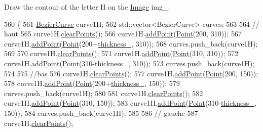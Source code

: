 Draw the contour of the letter H on the \mbox{\hyperlink{class_image}{Image}} img\+\_\+. 


\begin{DoxyCode}
560               \{
561     \mbox{\hyperlink{class_bezier_curve}{BezierCurve}} curve1H;
562     std::vector<BezierCurve> curves;
563 
564     \textcolor{comment}{// haut}
565     curve1H.\mbox{\hyperlink{class_bezier_curve_a0ba8ce66d5af5971ae6a1b506029728e}{clearPoints}}();
566     curve1H.\mbox{\hyperlink{class_bezier_curve_a38d16c18b36ae45619b05e26e226cf34}{addPoint}}(\mbox{\hyperlink{class_point}{Point}}(200, 310));
567     curve1H.\mbox{\hyperlink{class_bezier_curve_a38d16c18b36ae45619b05e26e226cf34}{addPoint}}(\mbox{\hyperlink{class_point}{Point}}(200+\mbox{\hyperlink{class_font_v1_aed8040e76be9a52833627b92f0fb4e5f}{thickness\_}}, 310));
568     curves.push\_back(curve1H);
569 
570     curve1H.\mbox{\hyperlink{class_bezier_curve_a0ba8ce66d5af5971ae6a1b506029728e}{clearPoints}}();
571     curve1H.\mbox{\hyperlink{class_bezier_curve_a38d16c18b36ae45619b05e26e226cf34}{addPoint}}(\mbox{\hyperlink{class_point}{Point}}(310, 310));
572     curve1H.\mbox{\hyperlink{class_bezier_curve_a38d16c18b36ae45619b05e26e226cf34}{addPoint}}(\mbox{\hyperlink{class_point}{Point}}(310-\mbox{\hyperlink{class_font_v1_aed8040e76be9a52833627b92f0fb4e5f}{thickness\_}}, 310));
573     curves.push\_back(curve1H);
574 
575     \textcolor{comment}{//bas}
576     curve1H.\mbox{\hyperlink{class_bezier_curve_a0ba8ce66d5af5971ae6a1b506029728e}{clearPoints}}();
577     curve1H.\mbox{\hyperlink{class_bezier_curve_a38d16c18b36ae45619b05e26e226cf34}{addPoint}}(\mbox{\hyperlink{class_point}{Point}}(200, 150));
578     curve1H.\mbox{\hyperlink{class_bezier_curve_a38d16c18b36ae45619b05e26e226cf34}{addPoint}}(\mbox{\hyperlink{class_point}{Point}}(200+\mbox{\hyperlink{class_font_v1_aed8040e76be9a52833627b92f0fb4e5f}{thickness\_}}, 150));
579     curves.push\_back(curve1H);
580 
581     curve1H.\mbox{\hyperlink{class_bezier_curve_a0ba8ce66d5af5971ae6a1b506029728e}{clearPoints}}();
582     curve1H.\mbox{\hyperlink{class_bezier_curve_a38d16c18b36ae45619b05e26e226cf34}{addPoint}}(\mbox{\hyperlink{class_point}{Point}}(310, 150));
583     curve1H.\mbox{\hyperlink{class_bezier_curve_a38d16c18b36ae45619b05e26e226cf34}{addPoint}}(\mbox{\hyperlink{class_point}{Point}}(310-\mbox{\hyperlink{class_font_v1_aed8040e76be9a52833627b92f0fb4e5f}{thickness\_}}, 150));
584     curves.push\_back(curve1H);
585 
586     \textcolor{comment}{// gauche}
587     curve1H.\mbox{\hyperlink{class_bezier_curve_a0ba8ce66d5af5971ae6a1b506029728e}{clearPoints}}();

\end{DoxyCode}

